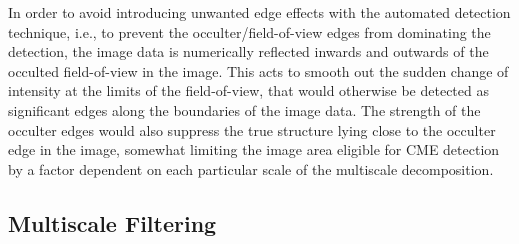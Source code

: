 \documentclass[preprint2]{aastex}
\begin{document}
In order to avoid introducing unwanted edge effects with the automated detection technique, i.e., to prevent the occulter/field-of-view edges from dominating the detection, the image data is numerically reflected inwards and outwards of the occulted field-of-view in the image. This acts to smooth out the sudden change of intensity at the limits of the field-of-view, that would otherwise be detected as significant edges along the boundaries of the image data. The strength of the occulter edges would also suppress the true structure lying close to the occulter edge in the image, somewhat limiting the image area eligible for CME detection by a factor dependent on each particular scale of the multiscale decomposition.

\subsection{Multiscale Filtering}
\label{sect_multiscale}
\end{document}
